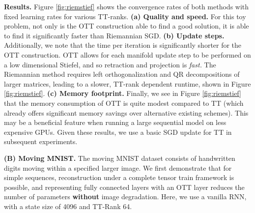 {\bf Results.} Figure \ref{fig:riemstief} shows the
convergence rates of both methods with fixed learning rates for various TT-ranks.
{\bf (a) Quality and speed.} For this toy problem, not only is the OTT construction able to find a good solution, it is able to find it significantly faster than Riemannian SGD.
{\bf (b) Update steps.} Additionally, we note that the time per iteration is significantly shorter for the OTT construction.
OTT allows for each manifold update step to be performed on a low dimensional Stiefel,
and so retraction and projection is \textit{fast.}
The Riemannian method requires left orthogonalization and QR decompositions
of larger matrices, leading to a slower, TT-rank dependent runtime, shown in Figure \ref{fig:riemstief}.
{\bf (c) Memory footprint.} Finally, we see in Figure \ref{fig:riemstief} that the memory consumption of OTT is quite modest compared to TT (which already offers
significant memory savings over alternative existing schemes). This may be a beneficial feature
when running a large sequential model on less expensive GPUs. 
Given these results, we use a basic SGD update for TT in subsequent experiments. 

\textbf{(B) Moving MNIST.}
The moving MNIST dataset \cite{srivastava2015unsupervised} consists of handwritten digits moving within a specified larger image.
We first demonstrate that
for simple sequences, reconstruction under a complete tensor train framework is possible,
and representing fully connected layers with an OTT layer
reduces the number of parameters {\bf without} image degradation.
Here, we use a vanilla RNN, with a state size of 4096 and TT-Rank 64.

